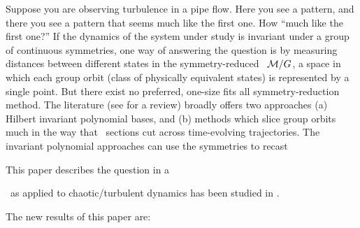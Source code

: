 

Suppose you are observing turbulence in a pipe flow. Here you see a
pattern, and there you see a pattern that seems much like the first one.
How ``much like the first one?'' If the dynamics of the system under study is invariant under
a group of continuous symmetries, one way of answering the question is by
measuring distances between different states in the
symmetry-reduced \statesp\ $\pS/\Group$, a space in which each group orbit (class
of physically equivalent states) is represented by a single point.
But there exist no preferred, one-size fits all
symmetry-reduction method. The literature
(see  for a review) broadly
offers two approaches (a) Hilbert invariant polynomial bases, and (b) methods which
slice group orbits much in the way that \Poincare\ sections cut across
time-evolving trajectories. The invariant polynomial approaches can use
the symmetries to recast

This paper describes  the question in a


\Mslices\ as applied to chaotic/turbulent dynamics has been
studied in .

The new results of this paper are:


%
